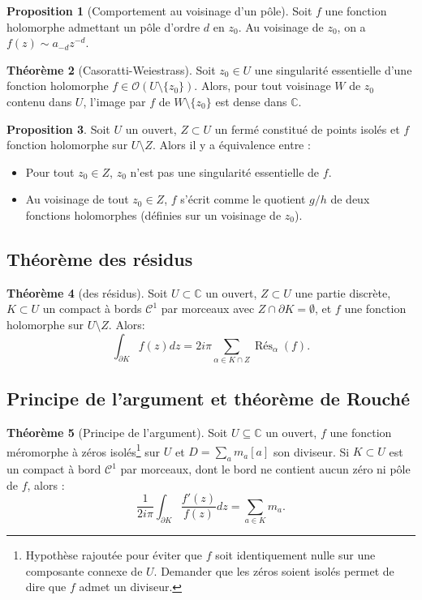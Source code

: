 \documentclass[11pt,a4paper]{article}
\newcommand{\C}{\mathbb{C}}
\theoremstyle{definition}
\newtheorem{theoreme}{Th\'eor\`eme}[section]
\newtheorem{proposition}[theoreme]{Proposition}
\theoremstyle{plain}
\begin{document}
\begin{proposition}[Comportement au voisinage d'un pôle]
Soit $f$ une fonction holomorphe admettant un pôle d'ordre $d$ en $z_0$.
Au voisinage de $z_0$, on a $f(z) \sim a_{-d}z^{-d}$.
\end{proposition}

\begin{theoreme}[Casoratti-Weiestrass]
Soit $z_0 \in U$ une singularité essentielle d'une fonction holomorphe $f \in \mathcal O(U\setminus \{z_0\})$.
Alors, pour tout voisinage $W$ de $z_0$ contenu dans $U$, l'image par $f$ de $W\setminus\{z_0\}$ est dense dans $\C$.
\end{theoreme}


\begin{proposition}
Soit $U$ un ouvert,  $Z\subset U$ un fermé constitué de points isolés et $f$ fonction holomorphe sur $U\setminus Z$.
Alors il y a équivalence entre :
\begin{itemize}
\item Pour tout $z_0\in Z$, $z_0$ n'est pas une singularité essentielle de $f$.
\item Au voisinage de tout $z_0\in Z$, $f$ s'écrit comme le quotient $g/h$ de deux fonctions holomorphes (définies sur un voisinage de $z_0$).
\end{itemize}
\end{proposition}


\subsection{Théorème des résidus}


\begin{theoreme}[des résidus]
Soit $U\subset \C$ un ouvert, $Z\subset U$ une partie discrète, $K\subset U$ un compact à bords $\mathcal C^1$ par morceaux avec $Z\cap \partial K = \emptyset$, et $f$ une fonction holomorphe sur $U\setminus Z$.
Alors:
\[ \int_{\partial K} f(z)dz = 2i\pi \sum_{\alpha \in K\cap Z} \operatorname{Rés}_\alpha(f).\]
\end{theoreme}



\subsection{Principe de l'argument et théorème de Rouché}



\begin{theoreme}[Principe de l'argument]
Soit $U\subseteq \C$ un ouvert, $f$ une fonction méromorphe à zéros isolés\footnote{Hypothèse rajoutée pour éviter que $f$ soit identiquement nulle sur une composante connexe de $U$. Demander que les zéros soient isolés permet de dire que $f$ admet un diviseur.} sur $U$ et $D = \sum_a m_a[a]$ son diviseur.
Si $K\subset U$ est un compact à bord $\mathcal C^1$ par morceaux, dont le bord ne contient aucun zéro ni pôle de $f$, alors :
\[ \frac{1}{2i\pi} \int_{\partial K} \frac{f'(z)}{f(z)}dz = \sum_{a \in K} m_a.\]
\end{theoreme}
\end{document}
